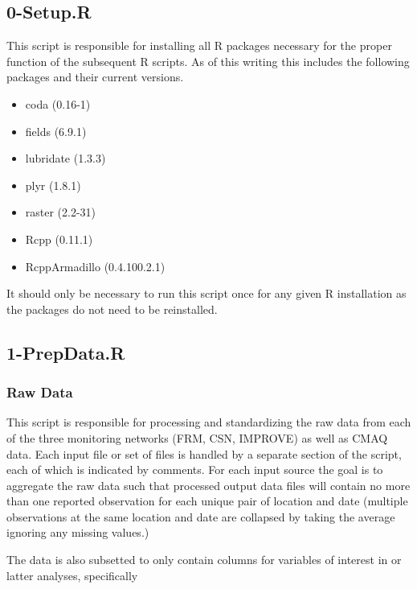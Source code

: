 \documentclass[11pt]{article}
\begin{document}
\subsection{0-Setup.R}

This script is responsible for installing all R packages necessary for the proper function of the subsequent R scripts. As of this writing this includes the following packages and their current versions.

\begin{multicols}{3}
\begin{itemize}
\item coda (0.16-1)     
\item fields (6.9.1)      
\item lubridate (1.3.3)      
\item plyr (1.8.1)      
\item raster (2.2-31)     
\item Rcpp (0.11.1)     
\item RcppArmadillo (0.4.100.2.1)
\end{itemize}
\end{multicols}
%
It should only be necessary to run this script once for any given R installation as the packages do not need to be reinstalled. 

\subsection{1-PrepData.R}

\subsubsection{Raw Data}

This script is responsible for processing and standardizing the raw data from each of the three monitoring networks (FRM, CSN, IMPROVE) as well as CMAQ data. Each input file or set of files is handled by a separate section of the script, each of which is indicated by comments. For each input source the goal is to aggregate the raw data such that processed output data files will contain no more than one reported observation for each unique pair of location and date (multiple observations at the same location and date are collapsed by taking the average ignoring any missing values.) 

The data is also subsetted to only contain columns for variables of interest in or latter analyses, specifically
\end{document}
